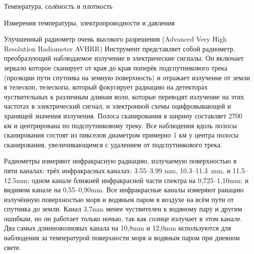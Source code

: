\begin{chapter}{Температура, солёность и плотность}
\begin{section}{Измерения температуры, электропроводности и давления}
\begin{paragraph}{Улучшенный радиометр очень высокого разрешения (Advanced Very High Resolution Radiometer AVHRR)}
Инструмент представляет собой радиометр, преобразующий наблюдаемое
излучение в электрические сигналы. Он включает зеркало которое
сканирует от края до края поперёк подспутникового трека (проэкции пути
спутника на земную поверхность) и отражает излучение от земли в
телескоп, телескопа, который фокусирует радиацию на детекторах
чуствительных к различным длинам волн, которые переводят излучение на
этих частотах в электрический сигнал, и электронной схемы
оцифровывающей и хранящей значения излучения. Полоса сканирования в
ширину составляет 2700 км и центрирована по подспутниковому треку. Все
наблюдения вдоль полосы сканирования состоят из пикселов диаметром
примерно 1 км у центра полосы сканирования, увеличивающимся с
удалением от подспутникового трека.
%


Радиометры измеряют инфракрасную радиацию, излучаемую поверхностью в
пяти каналах: трёх инфракрасных каналах: 3.55--3.99 mm, 10.3--11.3~mm,
и 11.5--12.5mm; одном канале ближней инфракрасной части спектра на
0,725--1,10mm; и видимом канале на 0,55--0,90mm. Все инфракрасные
каналы измеряют раиацию излучённую поверхностью моря и водяным паром в
воздухе на всём пути от спутника до земли. Канал 3,7mm менее
чуствителен к водяному пару и другим ошибкам, но он работает только
ночью, так как солнце излучает в этом канале. Два самых длинноволновых
канала на 10,8mm и 12,0mm используются для наблюдения за температурой
поверхности моря и водяным паром при дневном свете.
%


\end{paragraph}
\end{section}
\end{chapter}
